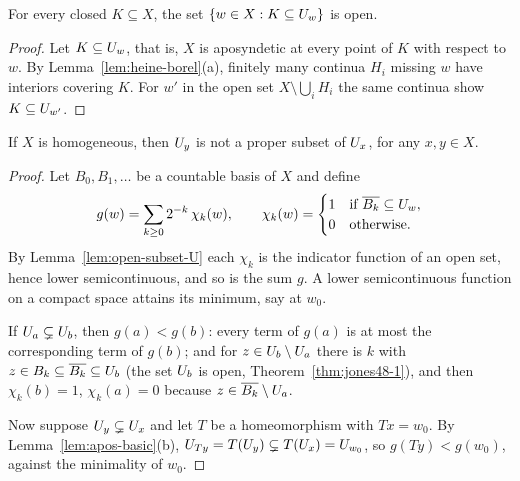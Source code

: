 \begin{lemma}\label{lem:open-subset-U}
For every closed $K\subseteq X$, the set $\left\{ w\in X : K\subseteq U_{w} \right\}$ is open.
\end{lemma}

\begin{proof}
Let $K\subseteq U_{w}$, that is, $X$ is aposyndetic at every point of $K$ with respect to $w$. By
Lemma~\ref{lem:heine-borel}(a), finitely many continua $H_i$ missing $w$ have interiors covering $K$. For $w'$
in the open set $X\setminus\bigcup_iH_i$ the same continua show $K\subseteq U_{w'}$.
\end{proof}


\begin{theorem}\label{thm:jones51-lemma}
If $X$ is homogeneous, then $U_{y}$ is not a proper subset of $U_{x}$, for any $x,y\in X$.
\end{theorem}

\begin{proof}
Let $B_0,B_1,\dots$ be a countable basis of $X$ and define
\[
g(w)=\sum_{k\ge0}2^{-k}\,\chi_k(w),\qquad \chi_k(w)=\begin{cases}1&\text{if }\overline{B_k}\subseteq U_{w},\\ 0&\text{otherwise.}\end{cases}
\]
By Lemma~\ref{lem:open-subset-U} each $\chi_k$ is the indicator function of an open set, hence lower
semicontinuous, and so is the sum $g$. A lower semicontinuous function on a compact space attains its
minimum, say at $w_0$.

If $U_{a}\subsetneq U_{b}$, then $g(a)<g(b)$: every term of $g(a)$ is at most the corresponding term of $g(b)$;
and for $z\in U_{b}\setminus U_{a}$ there is $k$ with $z\in B_k\subseteq\overline{B_k}\subseteq U_{b}$ (the set $U_{b}$ is open,
Theorem~\ref{thm:jones48-1}), and then $\chi_k(b)=1$, $\chi_k(a)=0$ because $z\in\overline{B_k}\setminus U_{a}$.

Now suppose $U_{y}\subsetneq U_{x}$ and let $T$ be a homeomorphism with $Tx=w_0$. By
Lemma~\ref{lem:apos-basic}(b), $U_{Ty}=T(U_{y})\subsetneq T(U_{x})=U_{w_0}$, so $g(Ty)<g(w_0)$, against the
minimality of $w_0$.
\end{proof}


